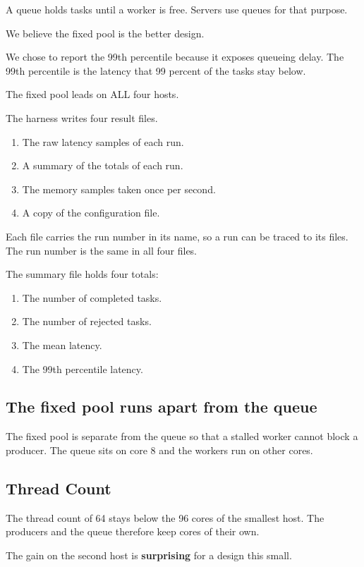 A queue holds tasks until a worker is free. Servers use queues for that purpose.

We believe the fixed pool is the better design.

We chose to report the 99th percentile because it exposes queueing delay. The 99th percentile is the latency that 99 percent of the tasks stay below.

The fixed pool leads on ALL four hosts.

The harness writes four result files.

\begin{enumerate}
\item The raw latency samples of each run.
\item A summary of the totals of each run.
\item The memory samples taken once per second.
\item A copy of the configuration file.
\end{enumerate}

Each file carries the run number in its name, so a run can be traced to its files. The run number is the same in all four files.

The summary file holds four totals:

\begin{enumerate}
\item The number of completed tasks.
\item The number of rejected tasks.
\item The mean latency.
\item The 99th percentile latency.
\end{enumerate}

\subsection{The fixed pool runs apart from the queue}

The fixed pool is separate from the queue so that a stalled worker cannot block a producer. The queue sits on core 8 and the workers run on other cores.

\subsection{Thread Count}

The thread count of 64 stays below the 96 cores of the smallest host. The producers and the queue therefore keep cores of their own.

The gain on the second host is \textbf{surprising} for a design this small.

